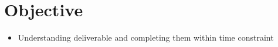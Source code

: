 \section{Objective}

\begin{itemize}
  \item Understanding deliverable and completing them within time constraint
\end{itemize}
